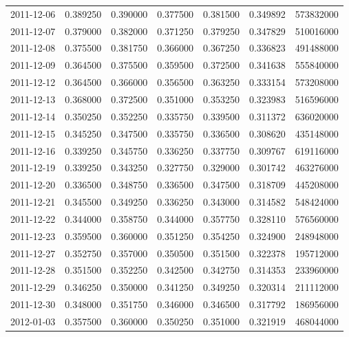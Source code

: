 \begin{tabular}{lrrrrrr}
2011-12-06 &    0.389250 &    0.390000 &    0.377500 &    0.381500 &    0.349892 &   573832000 \\
2011-12-07 &    0.379000 &    0.382000 &    0.371250 &    0.379250 &    0.347829 &   510016000 \\
2011-12-08 &    0.375500 &    0.381750 &    0.366000 &    0.367250 &    0.336823 &   491488000 \\
2011-12-09 &    0.364500 &    0.375500 &    0.359500 &    0.372500 &    0.341638 &   555840000 \\
2011-12-12 &    0.364500 &    0.366000 &    0.356500 &    0.363250 &    0.333154 &   573208000 \\
2011-12-13 &    0.368000 &    0.372500 &    0.351000 &    0.353250 &    0.323983 &   516596000 \\
2011-12-14 &    0.350250 &    0.352250 &    0.335750 &    0.339500 &    0.311372 &   636020000 \\
2011-12-15 &    0.345250 &    0.347500 &    0.335750 &    0.336500 &    0.308620 &   435148000 \\
2011-12-16 &    0.339250 &    0.345750 &    0.336250 &    0.337750 &    0.309767 &   619116000 \\
2011-12-19 &    0.339250 &    0.343250 &    0.327750 &    0.329000 &    0.301742 &   463276000 \\
2011-12-20 &    0.336500 &    0.348750 &    0.336500 &    0.347500 &    0.318709 &   445208000 \\
2011-12-21 &    0.345500 &    0.349250 &    0.336250 &    0.343000 &    0.314582 &   548424000 \\
2011-12-22 &    0.344000 &    0.358750 &    0.344000 &    0.357750 &    0.328110 &   576560000 \\
2011-12-23 &    0.359500 &    0.360000 &    0.351250 &    0.354250 &    0.324900 &   248948000 \\
2011-12-27 &    0.352750 &    0.357000 &    0.350500 &    0.351500 &    0.322378 &   195712000 \\
2011-12-28 &    0.351500 &    0.352250 &    0.342500 &    0.342750 &    0.314353 &   233960000 \\
2011-12-29 &    0.346250 &    0.350000 &    0.341250 &    0.349250 &    0.320314 &   211112000 \\
2011-12-30 &    0.348000 &    0.351750 &    0.346000 &    0.346500 &    0.317792 &   186956000 \\
2012-01-03 &    0.357500 &    0.360000 &    0.350250 &    0.351000 &    0.321919 &   468044000 \\

\end{tabular}
